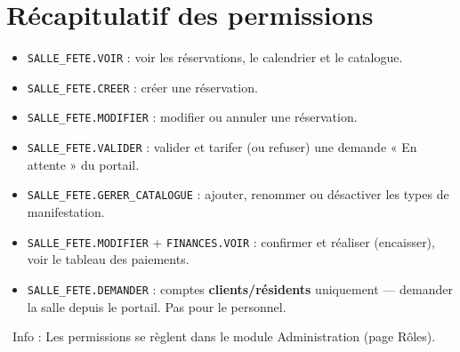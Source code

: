 \documentclass[12pt,a4paper]{article}
\newcommand{\info}[1]{\par\noindent\textcolor{lagoon}{\faInfoCircle\ Info : #1}\par}
\begin{document}
\newpage

\section{Récapitulatif des permissions}

\begin{itemize}[label=\textcolor{lagoon}{\faKey}]
  \item \texttt{SALLE\_FETE.VOIR} : voir les réservations, le calendrier et le catalogue.
  \item \texttt{SALLE\_FETE.CREER} : créer une réservation.
  \item \texttt{SALLE\_FETE.MODIFIER} : modifier ou annuler une réservation.
  \item \texttt{SALLE\_FETE.VALIDER} : valider et tarifer (ou refuser) une demande « En attente » du portail.
  \item \texttt{SALLE\_FETE.GERER\_CATALOGUE} : ajouter, renommer ou désactiver les types de manifestation.
  \item \texttt{SALLE\_FETE.MODIFIER} + \texttt{FINANCES.VOIR} : confirmer et réaliser (encaisser), voir le tableau des paiements.
  \item \texttt{SALLE\_FETE.DEMANDER} : comptes \textbf{clients/résidents} uniquement — demander la salle depuis le portail. Pas pour le personnel.
\end{itemize}

\info{Les permissions se règlent dans le module Administration (page Rôles).}

\vfill

\begin{center}
\end{center}
\end{document}
